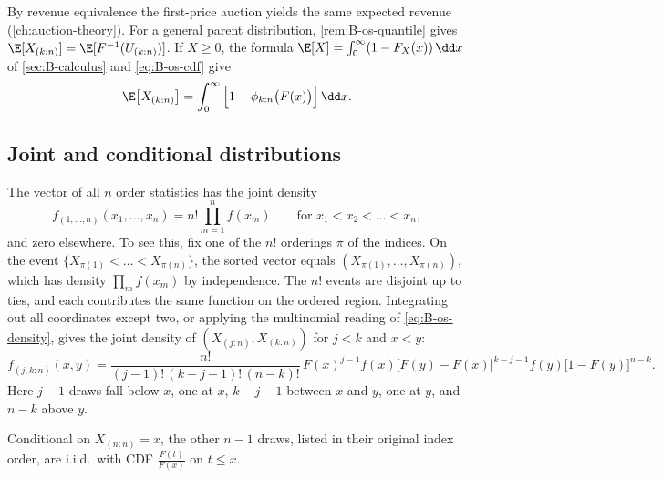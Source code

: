By revenue equivalence the first-price auction yields the same expected revenue (\cref{ch:auction-theory}).
For a general parent distribution, \cref{rem:B-os-quantile} gives $\E[X_{(k:n)}] =
\E[F^{-1}(U_{(k:n)})]$. If $X \geq 0$, the formula $\E[X] = \int_0^\infty(1 - F_X(x))\,\dd x$ of
\cref{sec:B-calculus} and \eqref{eq:B-os-cdf} give
\begin{equation}\label{eq:B-os-mean}
  \E\big[X_{(k:n)}\big] = \int_0^\infty\Big[1 - \phi_{k:n}\big(F(x)\big)\Big]\,\dd x.
\end{equation}

\subsection{Joint and conditional distributions}\label{sec:B-os-joint}

The vector of all $n$ order statistics has the joint density
\begin{equation}\label{eq:B-os-joint}
  f_{(1,\dots,n)}(x_1, \dots, x_n) = n!\prod_{m=1}^{n}f(x_m) \qquad \text{for } x_1 < x_2 < \dots < x_n,
\end{equation}
and zero elsewhere. To see this, fix one of the $n!$ orderings $\pi$ of the indices. On the event
$\{X_{\pi(1)} < \dots < X_{\pi(n)}\}$, the sorted vector equals $(X_{\pi(1)}, \dots, X_{\pi(n)})$, which has
density $\prod_m f(x_m)$ by independence. The $n!$ events are disjoint up to ties, and each contributes the
same function on the ordered region. Integrating out all coordinates except two, or applying the
multinomial reading of \eqref{eq:B-os-density}, gives the joint density of $(X_{(j:n)}, X_{(k:n)})$ for $j <
k$ and $x < y$:
\begin{equation}\label{eq:B-os-pair}
  f_{(j,k:n)}(x, y) = \frac{n!}{(j-1)!\,(k-j-1)!\,(n-k)!}\,F(x)^{j-1}f(x)\big[F(y) - F(x)\big]^{k-j-1}
  f(y)\big[1 - F(y)\big]^{n-k}.
\end{equation}
Here $j-1$ draws fall below $x$, one at $x$, $k-j-1$ between $x$ and $y$, one at $y$, and $n-k$ above $y$.

\begin{proposition}\label{prop:B-os-conditional}
Conditional on $X_{(n:n)} = x$, the other $n-1$ draws, listed in their original index order, are i.i.d.\
with CDF $\frac{F(t)}{F(x)}$ on $t \leq x$.
\end{proposition}

